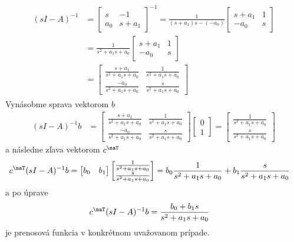 \documentclass[a4paper, 10pt, ]{article}
\begin{document}
\begin{align}
\begin{aligned}
    (s I - A)^{-1} &=
    \begin{bmatrix}
        s & -1 \\
        a_0 & s + a_1
    \end{bmatrix}^{-1}
    =
    \frac{1}{(s + a_1)s - (-a_0)}
    \begin{bmatrix}
        s + a_1 & 1 \\
        -a_0 & s
    \end{bmatrix} \\
    &=
    \frac{1}{s^2 + a_1s + a_0}
    \begin{bmatrix}
        s + a_1 & 1 \\
        -a_0 & s
    \end{bmatrix} \\
    &=
    \begin{bmatrix}
        \frac{s + a_1}{s^2 + a_1s + a_0} & \frac{1}{s^2 + a_1s + a_0} \\
        \frac{-a_0}{s^2 + a_1s + a_0} & \frac{s}{s^2 + a_1s + a_0}
    \end{bmatrix}
\end{aligned}
\end{align}
Vynásobme sprava vektorom $b$
\begin{align}
    (s I - A)^{-1} b &=
    \begin{bmatrix}
        \frac{s + a_1}{s^2 + a_1s + a_0} & \frac{1}{s^2 + a_1s + a_0} \\
        \frac{-a_0}{s^2 + a_1s + a_0} & \frac{s}{s^2 + a_1s + a_0}
    \end{bmatrix}
    \begin{bmatrix}
        0 \\ 1
    \end{bmatrix}
    =
    \begin{bmatrix}
        \frac{1}{s^2 + a_1s + a_0} \\
        \frac{s}{s^2 + a_1s + a_0}
    \end{bmatrix}
\end{align}
a následne zľava vektorom $c^\naT$
\begin{align}
    c^\naT (s I - A)^{-1} b &=
    \begin{bmatrix}
        b_0 & b_1
    \end{bmatrix}
    \begin{bmatrix}
        \frac{1}{s^2 + a_1s + a_0} \\
        \frac{s}{s^2 + a_1s + a_0}
    \end{bmatrix}
    =
    b_0 \frac{1}{s^2 + a_1s + a_0} + b_1 \frac{s}{s^2 + a_1s + a_0}
\end{align}
a po úprave
\begin{align}
    c^\naT (s I - A)^{-1} b &=
    \frac{b_0 + b_1 s}{s^2 + a_1s + a_0} 
\end{align}
je prenosová funkcia v konkrétnom uvažovanom prípade.
\end{document}
